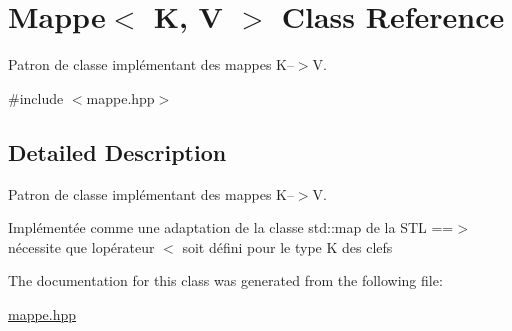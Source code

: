 \hypertarget{class_mappe_3_01_k_00_01_v_01_4}{}\section{Mappe$<$ K, V $>$ Class Reference}
\label{class_mappe_3_01_k_00_01_v_01_4}


Patron de classe implémentant des mappes K--$>$V.  




{\ttfamily \#include $<$mappe.\+hpp$>$}



\subsection{Detailed Description}
Patron de classe implémentant des mappes K--$>$V. 

Implémentée comme une adaptation de la classe std\+::map de la S\+T\+L ==$>$ nécessite que l\textquotesingle{}opérateur $<$ soit défini pour le type K des clefs 

The documentation for this class was generated from the following file\+:\begin{DoxyCompactItemize}
\item 
\hyperlink{mappe_8hpp}{mappe.\+hpp}\end{DoxyCompactItemize}
